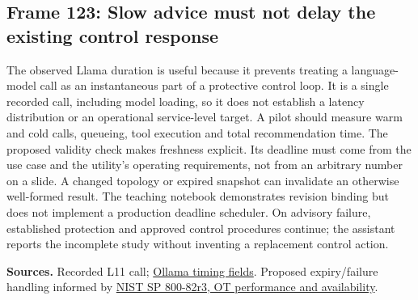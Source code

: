 \documentclass[11pt]{article}
\begin{document}
\subsection*{Frame 123: Slow advice must not delay the existing control response}
The observed Llama duration is useful because it prevents treating a language-model call as an instantaneous part of a protective control loop. It is a single recorded call, including model loading, so it does not establish a latency distribution or an operational service-level target. A pilot should measure warm and cold calls, queueing, tool execution and total recommendation time. The proposed validity check makes freshness explicit. Its deadline must come from the use case and the utility's operating requirements, not from an arbitrary number on a slide. A changed topology or expired snapshot can invalidate an otherwise well-formed result. The teaching notebook demonstrates revision binding but does not implement a production deadline scheduler. On advisory failure, established protection and approved control procedures continue; the assistant reports the incomplete study without inventing a replacement control action.\par
\par\nopagebreak\begin{minipage}{\linewidth}{\footnotesize\color{slate}\textbf{Sources.} Recorded L11 call; \href{https://docs.ollama.com/api/chat}{Ollama timing fields}. Proposed expiry/failure handling informed by \href{https://nvlpubs.nist.gov/nistpubs/SpecialPublications/NIST.SP.800-82r3.pdf}{NIST SP 800-82r3, OT performance and availability}.\par}\end{minipage}\par\medskip
\end{document}
